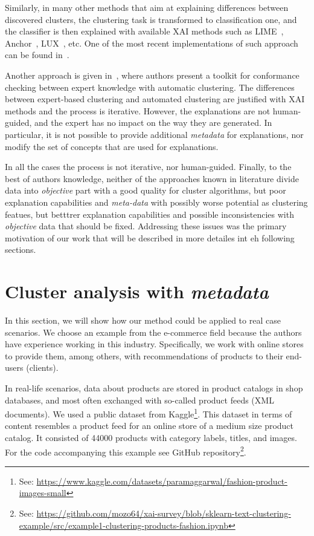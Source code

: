 \documentclass[
 twocolumn,
 hf,
]{ceurart}
\begin{document}
Similarly, in many other methods that aim at explaining differences between discovered clusters, the clustering task is transformed to classification one, and the classifier is then explained with available XAI methods such as LIME~\cite{lime}, Anchor~\cite{anchor}, LUX~\cite{lux2021iccs}, etc.
One of the most recent implementations of such approach can be found in~\cite{xaiclust2021}.

Another approach is given in~\cite{knac2021arxiv}, where authors present a toolkit for conformance checking between expert knowledge with automatic clustering.
The differences between expert-based clustering and automated clustering are justified with XAI methods and the process is iterative.
However, the explanations are not human-guided, and the expert has no impact on the way they are generated.
In particular, it is not possible to provide additional \textit{metadata} for explanations, nor modify the set of concepts that are used for explanations.

In all the cases the process is not  iterative, nor human-guided.
Finally, to the best of authors knowledge, neither of the approaches known in literature divide data into \textit{objective} part with a good quality for cluster algorithms, but poor explanation capabilities and \textit{meta-data} with possibly worse potential as clustering featues, but betttrer explanation capabilities and possible inconsistencies with \textit{objective} data that should be fixed.
Addressing these issues was the primary motivation of our work that will be described in more detailes int eh following sections.

\section{Cluster analysis with \textit{metadata}}
\label{sec:clumeta}
In this section, we will show how our method could be applied to real case scenarios.
We choose an example from the e-commerce field because the authors have experience working in this industry.
Specifically, we work with online stores to provide them, among others, with recommendations of products to their end-users (clients).

In real-life scenarios, data about products are stored in product catalogs in shop databases, and most often exchanged with so-called product feeds (XML documents).
We used a public dataset from Kaggle\footnote{See: \url{https://www.kaggle.com/datasets/paramaggarwal/fashion-product-images-small}}.
This dataset in terms of content resembles a product feed for an online store of a medium size product catalog.
It consisted of 44000 products with category labels, titles, and images.
For the code accompanying this example see GitHub repository\footnote{See: \url{https://github.com/mozo64/xai-survey/blob/sklearn-text-clustering-example/src/example1-clustering-products-fashion.ipynb}}.
\end{document}
